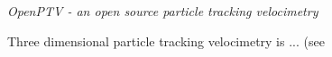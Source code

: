 \textit{OpenPTV - an open source particle tracking velocimetry} 

Three dimensional particle tracking velocimetry is ... (see \cite{1996}